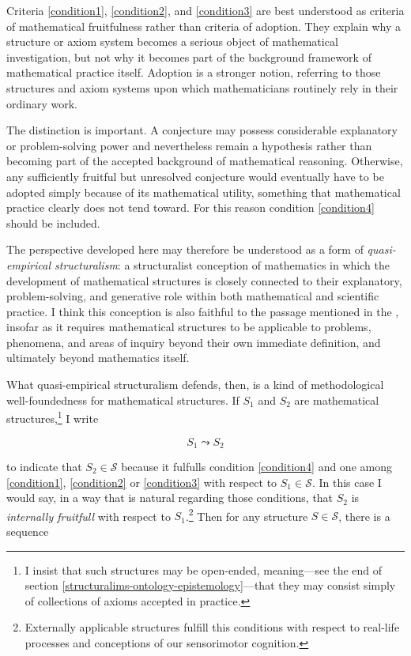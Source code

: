 \documentclass[11pt,a4paper]{book}
\theoremstyle{plain}
\begin{document}
Criteria \ref{condition1}, \ref{condition2}, and \ref{condition3} are best understood as criteria of mathematical fruitfulness rather than criteria of adoption. They explain why a structure or axiom system becomes a serious object of mathematical investigation, but not why it becomes part of the background framework of mathematical practice itself. Adoption is a stronger notion, referring to those structures and axiom systems upon which mathematicians routinely rely in their ordinary work.

The distinction is important. A conjecture may possess considerable explanatory or problem-solving power and nevertheless remain a hypothesis rather than becoming part of the accepted background of mathematical reasoning. Otherwise, any sufficiently fruitful but unresolved conjecture would eventually have to be adopted simply because of its mathematical utility, something that mathematical practice clearly does not tend toward. For this reason condition \ref{condition4} should be included.

The perspective developed here may therefore be understood as a form of \textit{quasi-empirical structuralism}: a structuralist conception of mathematics in which the development of mathematical structures is closely connected to their explanatory, problem-solving, and generative role within both mathematical and scientific practice. I think this conception is also faithful to the \textcite{Wittgenstein1978} passage mentioned in the , insofar as it requires mathematical structures to be applicable to problems, phenomena, and areas of inquiry beyond their own immediate definition, and ultimately beyond mathematics itself.

What quasi-empirical structuralism defends, then, is a kind of methodological well-foundedness for mathematical structures. If $S_1$ and $S_2$ are mathematical structures,\footnote{I insist that such structures may be open-ended, meaning—see the end of section \ref{structuralims-ontology-epistemology}—that they may consist simply of collections of axioms accepted in practice.} I write 

$$S_1 \leadsto S_2 $$

to indicate that $S_2 \in \mathcal{S}$ because it fulfulls condition \ref{condition4} and one among \ref{condition1}, \ref{condition2} or \ref{condition3} with respect to $S_1 \in \mathcal{S}$. In this case I would say, in a way that is natural regarding those conditions, that $S_2$ is \textit{internally fruitfull} with respect to $S_1$.\footnote{Externally applicable structures fulfill this conditions with respect to real-life processes and conceptions of our sensorimotor cognition.} Then for any structure $S \in \mathcal{S}$, there is a sequence 
\end{document}
